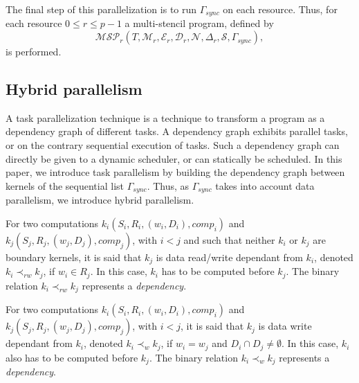  The final step of this parallelization is to run $\Gamma_{sync}$ on each resource. Thus, for each resource $0 \leq r \leq p-1$ a multi-stencil program, defined by
\begin{equation}
\mathcal{MSP}_r(T,\mathcal{M}_r,\mathcal{E}_r,\mathcal{D}_r,\mathcal{N},\Delta_r,\mathcal{S},\Gamma_{sync}),
\end{equation}
is performed.

\subsection{Hybrid parallelism}
A task parallelization technique is a technique to transform a program as a dependency graph of different tasks. A dependency graph exhibits parallel tasks, or on the contrary sequential execution of tasks. Such a dependency graph can directly be given to a dynamic scheduler, or can statically be scheduled. In this paper, we introduce task parallelism by building the dependency graph between kernels of the sequential list $\Gamma_{sync}$. Thus, as $\Gamma_{sync}$ takes into account data parallelism, we introduce hybrid parallelism.


\begin{mydef}
For two computations $k_i(S_i,R_i,(w_i,D_i),comp_i)$ and $k_j(S_j,R_j,(w_j,D_j),comp_j)$, with $i < j$ and such that neither $k_i$ or $k_j$ are boundary kernels, it is said that $k_j$ is data read/write dependant from $k_i$, denoted $k_i \prec_{rw} k_j$, if $w_i \in R_j$. In this case, $k_i$ has to be computed before $k_j$. The binary relation $k_i \prec_{rw} k_j$ represents a \textit{dependency}.
\end{mydef}

\begin{mydef}
For two computations $k_i(S_i,R_i,(w_i,D_i),comp_i)$ and $k_j(S_j,R_j,(w_j,D_j),comp_j)$, with $i < j$, it is said that $k_j$ is data write dependant from $k_i$, denoted $k_i \prec_{w} k_j$, if $w_i = w_j$ and $D_i \cap D_j \neq \emptyset$. In this case, $k_i$ also has to be computed before $k_j$. The binary relation $k_i \prec_{w} k_j$ represents a \textit{dependency}.
\end{mydef}

